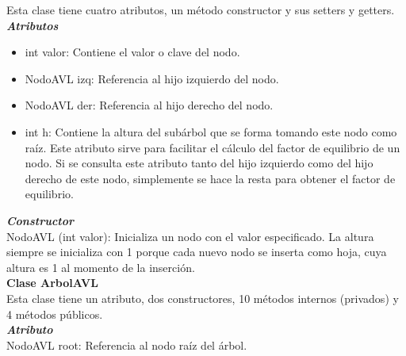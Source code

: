 \documentclass{article}
\begin{document}
Esta clase tiene cuatro atributos, un método constructor y sus setters y getters.\\

\textit{\textbf{Atributos}}

\begin{itemize}
\item int valor: Contiene el valor o clave del nodo.
\item NodoAVL izq: Referencia al hijo izquierdo del nodo.
\item NodoAVL der: Referencia al hijo derecho del nodo.
\item int h: Contiene la altura del subárbol que se forma tomando este nodo como raíz. Este atributo sirve para facilitar el cálculo del factor de equilibrio de un nodo. Si se consulta este atributo tanto del hijo izquierdo como del hijo derecho de este nodo, simplemente se hace la resta para obtener el factor de equilibrio.
\end{itemize}

\textit{\textbf{Constructor}}\\

NodoAVL (int valor): Inicializa un nodo con el valor especificado. La altura siempre se inicializa con 1 porque cada nuevo nodo se inserta como hoja, cuya altura es 1 al momento de la inserción.\\


\textbf{Clase ArbolAVL}\\

Esta clase tiene un atributo, dos constructores, 10 métodos internos (privados) y 4 métodos públicos.\\

\textit{\textbf{Atributo}}\\

NodoAVL root: Referencia al nodo raíz del árbol.\\
\end{document}
